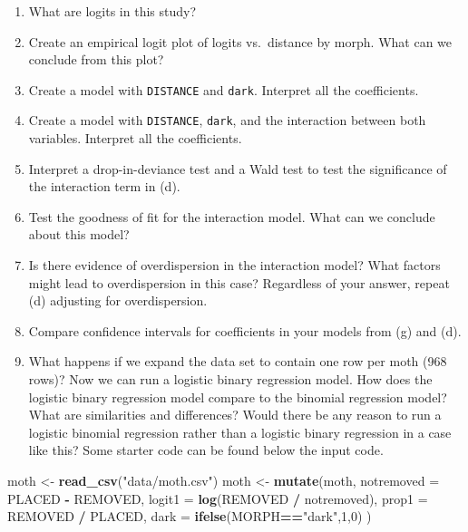 \documentclass[
]{krantz}
\newenvironment{Shaded}{\begin{snugshade}}{\end{snugshade}}
\newcommand{\DataTypeTok}[1]{\textcolor[rgb]{0.27,0.27,0.27}{#1}}
\newcommand{\DecValTok}[1]{\textcolor[rgb]{0.06,0.06,0.06}{#1}}
\newcommand{\KeywordTok}[1]{\textcolor[rgb]{0.27,0.27,0.27}{\textbf{#1}}}
\newcommand{\NormalTok}[1]{#1}
\newcommand{\OperatorTok}[1]{\textcolor[rgb]{0.43,0.43,0.43}{\textbf{#1}}}
\newcommand{\StringTok}[1]{\textcolor[rgb]{0.5,0.5,0.5}{#1}}
\providecommand{\tightlist}{%
  \setlength{\itemsep}{0pt}\setlength{\parskip}{0pt}}
\begin{document}
\begin{enumerate}
  \begin{enumerate}
  \def\labelenumii{\alph{enumii}.}
  \tightlist
  \item
    What are logits in this study?
  \item
    Create an empirical logit plot of logits vs.~distance by morph. What can we conclude from this plot?
  \item
    Create a model with \texttt{DISTANCE} and \texttt{dark}. Interpret all the coefficients.
  \item
    Create a model with \texttt{DISTANCE}, \texttt{dark}, and the interaction between both variables. Interpret all the coefficients.
  \item
    Interpret a drop-in-deviance test and a Wald test to test the significance of the interaction term in (d).
  \item
    Test the goodness of fit for the interaction model. What can we conclude about this model?
  \item
    Is there evidence of overdispersion in the interaction model? What factors might lead to overdispersion in this case? Regardless of your answer, repeat (d) adjusting for overdispersion.
  \item
    Compare confidence intervals for coefficients in your models from (g) and (d).
  \item
    What happens if we expand the data set to contain one row per moth (968 rows)? Now we can run a logistic binary regression model. How does the logistic binary regression model compare to the binomial regression model? What are similarities and differences? Would there be any reason to run a logistic binomial regression rather than a logistic binary regression in a case like this? Some starter code can be found below the input code.
  \end{enumerate}
\end{enumerate}

\begin{Shaded}
\begin{Highlighting}[]
\NormalTok{moth <-}\StringTok{ }\KeywordTok{read_csv}\NormalTok{(}\StringTok{"data/moth.csv"}\NormalTok{)}
\NormalTok{moth <-}\StringTok{ }\KeywordTok{mutate}\NormalTok{(moth, }
               \DataTypeTok{notremoved =}\NormalTok{ PLACED }\OperatorTok{-}\StringTok{ }\NormalTok{REMOVED, }
               \DataTypeTok{logit1 =} \KeywordTok{log}\NormalTok{(REMOVED }\OperatorTok{/}\StringTok{ }\NormalTok{notremoved),}
               \DataTypeTok{prop1 =}\NormalTok{ REMOVED }\OperatorTok{/}\StringTok{ }\NormalTok{PLACED, }
               \DataTypeTok{dark =} \KeywordTok{ifelse}\NormalTok{(MORPH}\OperatorTok{==}\StringTok{"dark"}\NormalTok{,}\DecValTok{1}\NormalTok{,}\DecValTok{0}\NormalTok{) )}
\end{Highlighting}
\end{Shaded}
\end{document}
